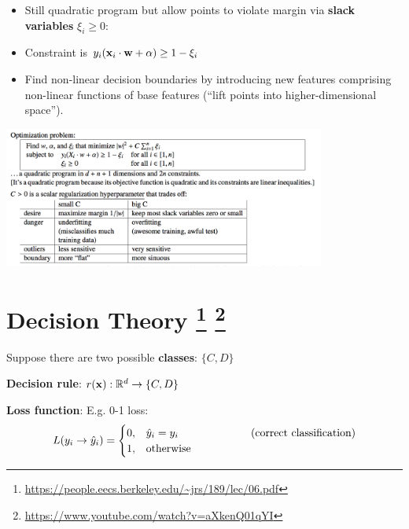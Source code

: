 \documentclass[12pt]{article}
\begin{document}
\begin{itemize}
\item Still quadratic program but allow points to violate margin via
  \textbf{slack variables} $\xi_i \geq 0$:
\item Constraint is $y_i(\mathbf x_i \cdot \mathbf w + \alpha) \geq 1 - \xi_i$
\item Find non-linear decision boundaries by introducing new features
  comprising non-linear functions of base features (``lift points into
  higher-dimensional space'').
\end{itemize}

\includegraphics[width=300pt]{img/machine-learning-svm-1.png}




\newpage
\section*{Decision Theory
  \footnote{\url{https://people.eecs.berkeley.edu/~jrs/189/lec/06.pdf}}
  \footnote{\url{https://www.youtube.com/watch?v=aXkenQ01qYI}}
}

Suppose there are two possible \textbf{classes}: $\{C, D\}$

\textbf{Decision rule}: $r(\mathbf x): \mathbb{R}^d \to \{C, D\}$

\textbf{Loss function}: E.g. 0-1 loss:
\begin{align*}
  L(y_i \to \hat y_i) =
  \begin{cases}
    0, & \hat y_i = y_i ~~~~~~~~~~~~~~~~~~~~\text{(correct classification)}\\
    1, & \text{otherwise}
  \end{cases}
\end{align*}
\end{document}
